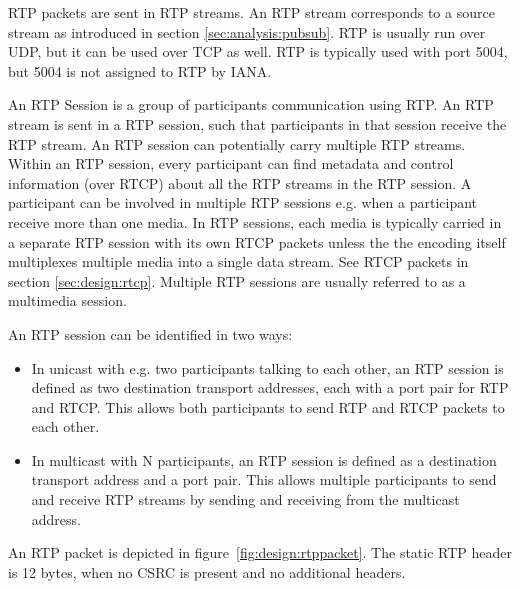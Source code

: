  \label{sec:design:rtpstream}
RTP packets are sent in RTP streams. An RTP stream corresponds to a source stream as introduced in section \ref{sec:analysis:pubsub}. RTP is usually run over UDP, but it can be used over TCP as well. RTP is typically used with port 5004, but 5004 is not assigned to RTP by IANA\citep{iana_ports}.


 \label{sec:design:rtpsession}
An RTP Session is a group of participants communication using RTP.
An RTP stream is sent in a RTP session, such that participants in that session receive the RTP stream. An RTP session can potentially carry multiple RTP streams. Within an RTP session, every participant can find metadata and control information (over RTCP) about all the RTP streams in the RTP session. A participant can be involved in multiple RTP sessions e.g. when a participant receive more than one media. In RTP sessions, each media is typically carried in a separate RTP session with its own RTCP packets unless the the encoding itself multiplexes multiple media into a single data stream. See RTCP packets in section \ref{sec:design:rtcp}. Multiple RTP sessions are usually referred to as a multimedia session.


An RTP session can be identified in two ways:
\begin{itemize}
	\item In unicast with e.g. two participants talking to each other, an RTP session is defined as two destination transport addresses, each with a port pair for RTP and RTCP. This allows both participants to send RTP and RTCP packets to each other.
	\item In multicast with N participants, an RTP session is defined as a destination transport address and a port pair. This allows multiple participants to send and receive RTP streams by sending and receiving from the multicast address.
\end{itemize}

An RTP packet is depicted in figure~\ref{fig:design:rtppacket}. The static RTP header is 12 bytes, when no CSRC is present and no additional headers.

